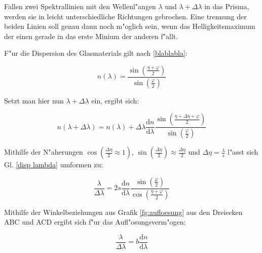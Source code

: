 	Fallen zwei Spektrallinien mit den Wellenl"angen $\lambda$ und $\lambda + \Delta\lambda$ in das Prisma, werden sie in leicht unterschiedliche Richtungen gebrochen.
	Eine trennung der beiden Linien soll genau dann noch m"oglich sein, wenn das Helligkeitsmaximum der einen gerade in das erste Minium der anderen f"allt.

	F"ur die Dispersion des Glasmaterials gilt nach \ref{blablabla}:

	\begin{equation}
		n(\lambda) = \frac{\sin( \frac{\eta + \varphi}{2} )}{\sin(\frac{\varphi}{2})} 
	\end{equation}

	Setzt man hier nun $\lambda + \Delta\lambda$ ein, ergibt sich:

	\begin{equation}
		n(\lambda + \Delta\lambda) = n(\lambda) + \Delta\lambda \frac{\mathrm{d}n}{\mathrm{d}\lambda}	\frac{\sin( \frac{\eta + \Delta\eta + \varphi}{2} )}{\sin(\frac{\varphi}{2})}  \label{disp lambda}
	\end{equation}

	Mithilfe der N"aherungen $\cos(\frac{\Delta\eta}{2} \approx 1)$, $\sin(\frac{\Delta\eta}{2}) \approx \frac{\Delta\eta}{2}$ und $\Delta\eta = \frac{\lambda}{s}$ l"asst sich Gl. \eqref{disp lambda} umformen zu:

	\begin{equation}
		\frac{\lambda}{\Delta\lambda} = 2s \frac{\mathrm{d}n}{\mathrm{d}\lambda} \frac{\sin(\frac{\varphi}{2})}{\cos(\frac{\eta+\varphi}{2})} 
	\end{equation}

	Mithilfe der Winkelbeziehungen aus Grafik \ref{fg:aufloesung} aus den Dreiecken ABC und ACD ergibt sich f"ur das Aufl"osungsverm"ogen:

	\begin{equation}
		\frac{\lambda}{\Delta\lambda} = b \frac{\mathrm{d}n}{\mathrm{d}\lambda} 
	\end{equation}